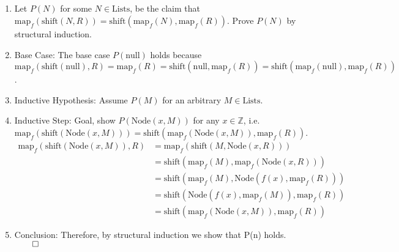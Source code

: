 \documentclass[11pt]{article}
\newcommand{\Z}{\mathbb{Z}}
\begin{document}
\subsection{} %
\begin{enumerate}
	\item Let $P(N)$ for some $N \in \text{Lists}$, be the claim that $\text{map}_f(\text{shift}(N, R)) = \text{shift}(\text{map}_f(N), \text{map}_f(R))$. Prove $P(N)$ by structural induction. 
	\item Base Case: The base case $P(\text{null})$ holds because $\text{map}_f(\text{shift}(\text{null}), R) = \text{map}_f(R) = \text{shift}(\text{null}, \text{map}_f(R)) = \text{shift}(\text{map}_f(\text{null}),  \text{map}_f(R))$. 
	\item Inductive Hypothesis: Assume $P(M)$ for an arbitrary $M \in \text{Lists}$. 
	\item Inductive Step: Goal, show $P(\text{Node}(x, M))$ for any $x \in \Z$, i.e. $\text{map}_f(\text{shift}(\text{Node}(x, M))) = \text{shift}(\text{map}_f(\text{Node}(x, M)), \text{map}_f(R))$. 
	\begin{align*}
		\text{map}_f(\text{shift}(\text{Node}(x, M)), R) &= \text{map}_f(\text{shift}(M, \text{Node}(x, R))) \tag*{Definition of shift()} \\
		&= \text{shift}(\text{map}_f(M), \text{map}_f(\text{Node}(x, R))) \tag*{Inductive Hypothesis} \\
		&= \text{shift}(\text{map}_f(M), \text{Node}(f(x), \text{map}_f(R))) \tag*{Definition of map$_f$()} \\
		&= \text{shift}(\text{Node}(f(x), \text{map}_f(M)), \text{map}_f(R)) \tag*{Definition of shift()} \\
		&= \text{shift}(\text{map}_f(\text{Node}(x, M)), \text{map}_f(R)) \tag*{Definition of map$_f$()}
	\end{align*}
	\item Conclusion: Therefore, by structural induction we show that P(n) holds. $\qed$
\end{enumerate}
\end{document}
